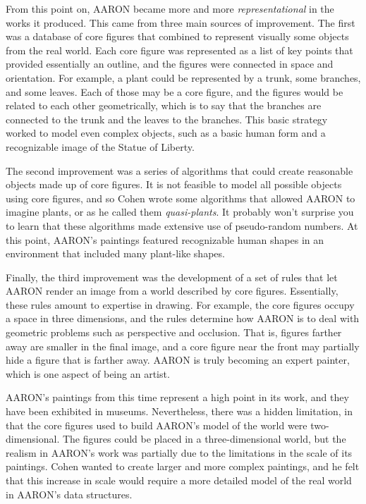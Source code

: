 From this point on, AARON became more and more \emph{representational} in
the works it produced. This came from three main sources of improvement. The first
was a database of core figures that combined to represent visually some
objects from the real world. Each core figure was represented as a list of
key points that provided essentially an outline, and the figures were connected
in space and orientation.
For example, a plant could be represented by
a trunk, some branches, and some leaves. Each of those may be a core figure,
and the figures would be related to each other geometrically, which is to say
that the branches are connected to the trunk and the leaves to the branches.
This basic strategy worked to model even complex objects, such as a basic human
form and a recognizable image of the Statue of Liberty.

The second improvement was a series of algorithms that could create reasonable
objects made up of core figures. It is not feasible to model all possible
objects using core figures, and so Cohen wrote some algorithms that allowed AARON to
imagine plants,
or as he called them \emph{quasi-plants}. It probably won't surprise
you to learn that these algorithms made extensive use of pseudo-random numbers.
At this point, AARON's paintings featured recognizable human shapes
in an environment that included many plant-like shapes.

Finally, the third improvement was the development of a set of rules that
let AARON render an image from a world described by core figures. Essentially,
these rules amount to expertise in drawing. For example, the core figures occupy
a space in three dimensions, and the rules determine how AARON is to deal with
geometric problems such as perspective and occlusion. That is, figures farther
away are smaller in the final image, and a core figure near the front may
partially hide a figure that is farther away. AARON is truly becoming an expert
painter, which is one aspect of being an artist.

AARON's paintings from this time represent a high point in its work, and they
have been exhibited in museums.
Nevertheless, there was a hidden limitation, in that the core figures
used to build AARON's model of the world were two-dimensional. The figures could be
placed in a three-dimensional world, but the realism in AARON's work was partially
due to the limitations in the scale of its paintings. Cohen wanted to create larger
and more complex paintings, and he felt that this increase in scale would require a
more detailed model of the real world in AARON's data structures.

